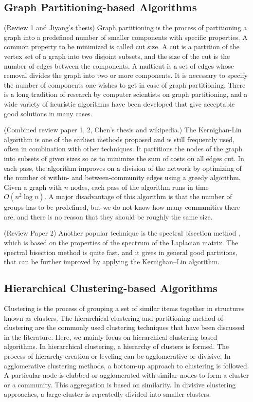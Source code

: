 \documentclass[\main/thesis.tex]{subfiles}
\begin{document}
\subsection{Graph Partitioning-based Algorithms}
(Review 1 and Jiyang's thesis) Graph partitioning is the process of partitioning a graph into a predefined number of smaller components with specific properties. A common property to be minimized is called cut size. A cut is a partition of the vertex set of a graph into two disjoint subsets, and the size of the cut is the number of edges between the components. A multicut is a set of edges whose removal divides the graph into two or more components. It is necessary to specify the number of components one wishes to get in case of graph partitioning. There is a long tradition of research by computer scientists on graph partitioning, and a wide variety of heuristic algorithms have been developed that give acceptable good solutions in many cases.

(Combined review paper 1, 2, Chen's thesis and wikipedia.) The Kernighan-Lin \cite{kernighan1970efficient} algorithm is one of the earliest methods proposed and is still frequently used, often in combination with other techniques. It partitions the nodes of the graph into subsets of given sizes so as to minimize the sum of costs on all edges cut. In each pass, the algorithm improves on a division of the network by optimizing of the number of within- and between-community edges using a greedy algorithm. Given a graph with $n$ nodes, each pass of the algorithm runs in time $O(n^2 \log n)$. A major disadvantage of this algorithm is that the number of groups has to be predefined, but we do not know how many communities there are, and there is no reason that they should be roughly the same size.

(Review Paper 2) Another popular technique is the spectral bisection method \cite{barnes1982algorithm}, which is based on the properties of the spectrum of the Laplacian matrix. The spectral bisection method is quite fast, and it gives in general good partitions, that can be further improved by applying the Kernighan–Lin algorithm.

\subsection{Hierarchical Clustering-based Algorithms}
Clustering is the process of grouping a set of similar items together in structures known as clusters. The hierarchical clustering and partitioning method of clustering are the commonly used clustering techniques that have been discussed in the literature. Here, we mainly focus on hierarchical clustering-based algorithms. In hierarchical clustering, a hierarchy of clusters is formed. The process of hierarchy creation or leveling can be agglomerative or divisive. In agglomerative clustering methods, a bottom-up approach to clustering is followed. A particular node is clubbed or agglomerated with similar nodes to form a cluster or a community. This aggregation is based on similarity. In divisive clustering approaches, a large cluster is repeatedly divided into smaller clusters.
\end{document}
